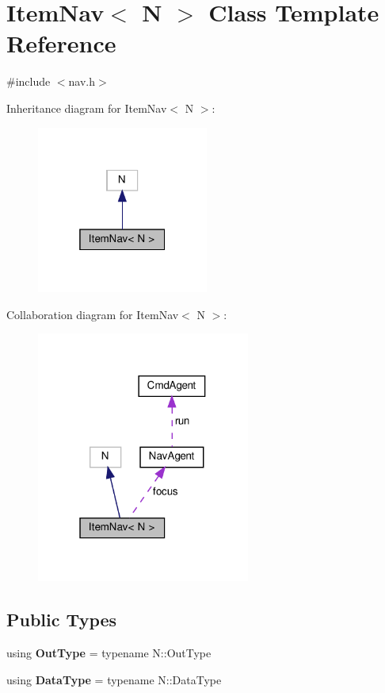 \hypertarget{classItemNav}{}\section{Item\+Nav$<$ N $>$ Class Template Reference}
\label{classItemNav}


{\ttfamily \#include $<$nav.\+h$>$}



Inheritance diagram for Item\+Nav$<$ N $>$\+:\nopagebreak
\begin{figure}[H]
\begin{center}
\leavevmode
\includegraphics[width=160pt]{classItemNav__inherit__graph}
\end{center}
\end{figure}


Collaboration diagram for Item\+Nav$<$ N $>$\+:\nopagebreak
\begin{figure}[H]
\begin{center}
\leavevmode
\includegraphics[width=199pt]{classItemNav__coll__graph}
\end{center}
\end{figure}
\subsection*{Public Types}
\begin{DoxyCompactItemize}
\item 
\mbox{\label{classItemNav_a6efca103e15edfd3882d78ef119da839}} 
using {\bfseries Out\+Type} = typename N\+::\+Out\+Type
\item 
\mbox{\label{classItemNav_ad5372e07cabe1fe3f121bd1aa94616ff}} 
using {\bfseries Data\+Type} = typename N\+::\+Data\+Type
\end{DoxyCompactItemize}
